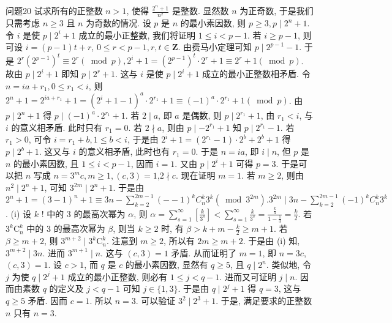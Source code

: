 问题20 试求所有的正整数 $n>1$, 使得 $\frac{2^n+1}{n^2}$ 是整数.
显然数 $n$ 为正奇数, 于是我们只需考虑 $n \geqslant 3$ 且 $n$ 为奇数的情况.
设 $p$ 是 $n$ 的最小素因数, 则 $p \geqslant 3, p \mid 2^n+1$. 令 $i$ 是使 $p \mid 2^i+1$ 成立的最小正整数, 我们将证明 $1 \leqslant i<p-1$. 若 $i \geqslant p-1$, 则可设 $i=(p-1) t+r$, $0 \leqslant r<p-1, r, t \in \mathbf{Z}$. 由费马小定理可知 $p \mid 2^{p-1}-1$. 于是 $2^r\left(2^{p-1}\right)^t \equiv 2^r (\bmod p), 2^i+1=\left(2^{p-1}\right)^t \cdot 2^r+1 \equiv 2^r+1(\bmod p)$. 故由 $p \mid 2^i+1$ 即知 $p \mid 2^r+1$. 这与 $i$ 是使 $p \mid 2^i+1$ 成立的最小正整数相矛盾.
令 $n=i a+r_1, 0 \leqslant r_1<i$, 则 $2^n+1=2^{i a+r_1}+1=\left(2^i+1-1\right)^a \cdot 2^{r_1}+ 1 \equiv(-1)^a \cdot 2^{r_1}+1(\bmod p)$. 由 $p \mid 2^n+1$ 得 $p \mid(-1)^a \cdot 2^{r_1}+1$. 若 $2 \mid a$, 即 $a$ 是偶数, 则 $p \mid 2^{r_1}+1$, 由 $r_1<i$, 与 $i$ 的意义相矛盾.
此时只有 $r_1=0$. 若 $2 \nmid a$, 则由 $p \mid-2^{r_1}+1$ 知 $p \mid 2^{r_1}-1$. 若 $r_1>0$, 可令 $i=r_1+b, 1 \leqslant b<i$, 于是由 $2^i+1=\left(2^{r_1}-1\right) \cdot 2^b+2^b+1$ 得 $p \mid 2^b+1$. 这又与 $i$ 的意义相矛盾, 此时也有 $r_1=0$. 于是 $n=i a$, 即 $i \mid n$, 但 $p$ 是 $n$ 的最小素因数, 且 $1 \leqslant i<p-1$, 因而 $i=1$. 又由 $p \mid 2^i+1$ 可得 $p=3$. 于是可以把 $n$ 写成 $n=3^m c, m \geqslant 1,(c, 3) =1$,$2 \nmid c$.
现在证明 $m=1$. 若 $m \geqslant 2$, 则由 $n^2 \mid 2^n+1$, 可知 $3^{2 m} \mid 2^n+1$. 于是由 $2^n+ 1=(3-1)^n+1 \equiv 3 n-\sum_{k=2}^{2 m-1}(--1)^k C_n^k 3^k\left(\bmod 3^{2 m}\right) .3^{2 m} \mid 3 n-\sum_{k=2}^{2 m-1}(-1)^k C_n^k 3^k$. (i) 
设 $k$ ! 中的 3 的最高次幂为 $\alpha$, 则 $\alpha=\sum_{s=1}^{\infty}\left[\frac{k}{3^s}\right]<\sum_{s=1}^{\infty} \frac{k}{3^s}=\frac{\frac{k}{3}}{1-\frac{1}{3}}=\frac{k}{2}$. 若 $3^k \mathrm{C}_n^k$ 中的 3 的最高次幂为 $\beta$, 则当 $k \geqslant 2$ 时, 有 $\beta>k+m-\frac{k}{2} \geqslant m+1$. 若 $\beta \geqslant m+2$, 则 $3^{m+2} \mid 3^k \mathrm{C}_n^k$. 注意到 $m \geqslant 2$, 所以有 $2 m \geqslant m+2$. 于是由 (i) 知, $3^{m+2} \mid 3 n$. 进而 $3^{m+1} \mid n$. 这与 $(c, 3)=1$ 矛盾.
从而证明了 $m=1$, 即 $n=3 c$, $(c, 3)=1$.
设 $c>1$, 而 $q$ 是 $c$ 的最小素因数, 显然有 $q \geqslant 5$, 且 $q \mid 2^n$. 类似地, 令 $j$ 为使 $q \mid 2^j+1$ 成立的最小正整数, 则必有 $1 \leqslant j<q-1$. 进而又可证明 $j \mid n$. 因而由素数 $q$ 的定义及 $j<q-1$ 可知 $j \in\{1,3\}$. 于是由 $q \mid 2^j+1$ 得 $q=3$, 这与 $q \geqslant 5$ 矛盾.
因而 $c=1$. 所以 $n=3$.
可以验证 $3^2 \mid 2^3+1$. 于是, 满足要求的正整数 $n$ 只有 $n=3$.


